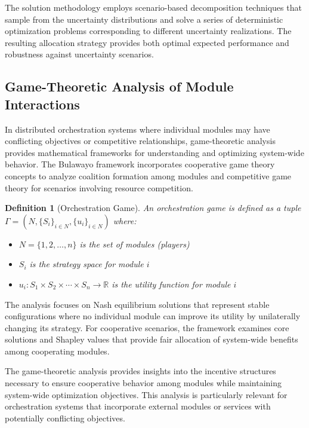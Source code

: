 \documentclass[12pt,a4paper]{article}
\newtheorem{definition}[theorem]{Definition}
\begin{document}
The solution methodology employs scenario-based decomposition techniques that sample from the uncertainty distributions and solve a series of deterministic optimization problems corresponding to different uncertainty realizations. The resulting allocation strategy provides both optimal expected performance and robustness against uncertainty scenarios.

\subsection{Game-Theoretic Analysis of Module Interactions}

In distributed orchestration systems where individual modules may have conflicting objectives or competitive relationships, game-theoretic analysis provides mathematical frameworks for understanding and optimizing system-wide behavior. The Bulawayo framework incorporates cooperative game theory concepts to analyze coalition formation among modules and competitive game theory for scenarios involving resource competition.

\begin{definition}[Orchestration Game]
An orchestration game is defined as a tuple $\Gamma = (N, \{S_i\}_{i \in N}, \{u_i\}_{i \in N})$ where:
\begin{itemize}
\item $N = \{1, 2, \ldots, n\}$ is the set of modules (players)
\item $S_i$ is the strategy space for module $i$
\item $u_i : S_1 \times S_2 \times \cdots \times S_n \rightarrow \mathbb{R}$ is the utility function for module $i$
\end{itemize}
\end{definition}

The analysis focuses on Nash equilibrium solutions that represent stable configurations where no individual module can improve its utility by unilaterally changing its strategy. For cooperative scenarios, the framework examines core solutions and Shapley values that provide fair allocation of system-wide benefits among cooperating modules.

The game-theoretic analysis provides insights into the incentive structures necessary to ensure cooperative behavior among modules while maintaining system-wide optimization objectives. This analysis is particularly relevant for orchestration systems that incorporate external modules or services with potentially conflicting objectives.
\end{document}
